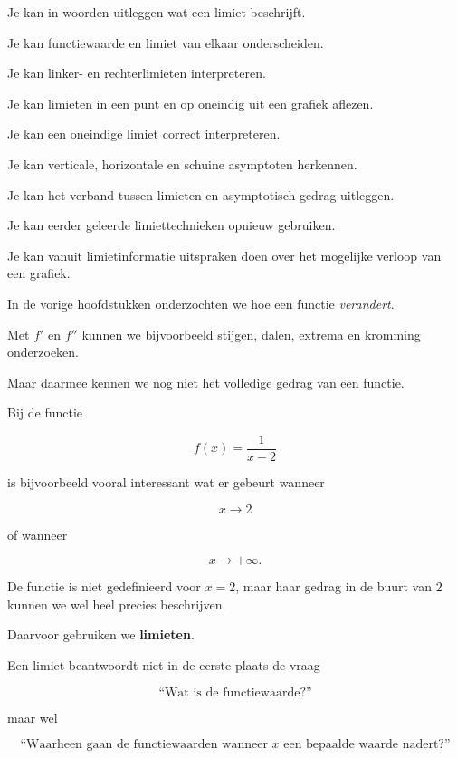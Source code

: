 \documentclass{ximera}
\begin{document}
  \begin{leerdoelen}
    \item Je kan in woorden uitleggen wat een limiet beschrijft.
    \item Je kan functiewaarde en limiet van elkaar onderscheiden.
    \item Je kan linker- en rechterlimieten interpreteren.
    \item Je kan limieten in een punt en op oneindig uit een grafiek aflezen.
    \item Je kan een oneindige limiet correct interpreteren.
    \item Je kan verticale, horizontale en schuine asymptoten herkennen.
    \item Je kan het verband tussen limieten en asymptotisch gedrag uitleggen.
    \item Je kan eerder geleerde limiettechnieken opnieuw gebruiken.
    \item Je kan vanuit limietinformatie uitspraken doen over het mogelijke verloop van een grafiek.
  \end{leerdoelen}




In de vorige hoofdstukken onderzochten we hoe een functie
\emph{verandert}.

Met $f'$ en $f''$ kunnen we bijvoorbeeld stijgen, dalen, extrema en
kromming onderzoeken.

Maar daarmee kennen we nog niet het volledige gedrag van een functie.

Bij de functie

\[
f(x)=\frac{1}{x-2}
\]

is bijvoorbeeld vooral interessant wat er gebeurt wanneer

\[
x\to2
\]

of wanneer

\[
x\to+\infty.
\]

De functie is niet gedefinieerd voor $x=2$, maar haar gedrag in de
buurt van $2$ kunnen we wel heel precies beschrijven.

Daarvoor gebruiken we \textbf{limieten}.

\begin{opmerking}
Een limiet beantwoordt niet in de eerste plaats de vraag

\[
\text{``Wat is de functiewaarde?''}
\]

maar wel

\[
\boxed{
\text{``Waarheen gaan de functiewaarden wanneer }x
\text{ een bepaalde waarde nadert?''}
}
\]
\end{opmerking}
\end{document}
